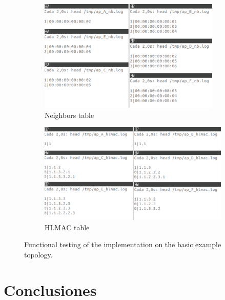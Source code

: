 \begin{figure}[ht!]
  \centering
  \begin{subfigure}{.5\textwidth}
    \centering
    \includegraphics[width=0.95\textwidth]{fig/04_in-band/in_band_10.png}
    \caption{Neighbors table}
    \label{fig:subfiguraA2}
  \end{subfigure}%
  \begin{subfigure}{.5\textwidth}
    \centering
    \includegraphics[width=\textwidth]{fig/04_in-band/in_band_11.png}
    \caption{HLMAC table}
    \label{fig:subfiguraB2}
  \end{subfigure}
  \caption{Functional testing of the implementation on the basic example topology.}
  \label{fig:figuraCompleta2}
\end{figure}

\section{Conclusiones}

